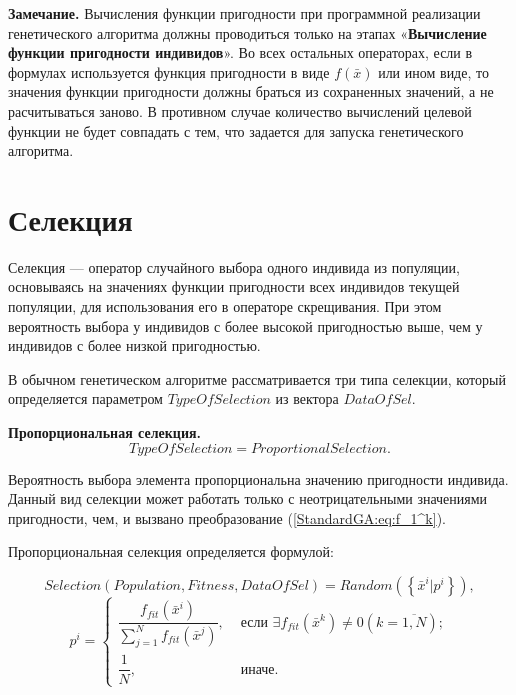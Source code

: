 \textbf{Замечание.} Вычисления функции пригодности при программной реализации генетического алгоритма должны проводиться только на этапах «\textbf{Вычисление функции пригодности индивидов}». Во всех остальных операторах, если в формулах используется функция пригодности в виде $f\left( \bar{x}\right) $ или ином виде, то значения функции пригодности должны браться из сохраненных значений, а не расчитываться заново. В противном случае количество вычислений целевой функции не будет совпадать с тем, что задается для запуска генетического алгоритма.

\section{Селекция} \label{StandardGA:subsection_selection}

Селекция --- оператор случайного выбора одного индивида из популяции, основываясь на значениях функции пригодности всех индивидов текущей популяции, для использования его в операторе скрещивания. При этом вероятность выбора у индивидов с более высокой пригодностью выше, чем у индивидов с более низкой пригодностью.

В обычном генетическом алгоритме рассматривается три типа селекции, который определяется параметром $ TypeOfSelection $ из вектора $ DataOfSel $.

\textbf{Пропорциональная селекция.}
\begin{equation}
\label{StandardGA:eq:ProportionalSelection}
TypeOfSelection=ProportionalSelection.
\end{equation}

Вероятность выбора элемента пропорциональна значению пригодности индивида. Данный вид селекции может работать только с неотрицательными значениями пригодности, чем, и вызвано преобразование (\ref{StandardGA:eq:f_1^k}).

Пропорциональная селекция определяется формулой:

\begin{equation}
\label{StandardGA:eq:ProportionalSelection2}
Selection\left( Population, Fitness, DataOfSel\right) = Random\left( \left\lbrace\bar{x}^i | p^i \right\rbrace \right),
\end{equation}
\begin{equation}
p^i=\left\lbrace \begin{aligned}
\dfrac{f_{fit}\left( \bar{x}^i\right) }{\sum_{j=1}^N{f_{fit}\left( \bar{x}^j\right)}},&\text { если }  \exists f_{fit}\left( \bar{x}^k\right)\neq 0 \left( k=\overline{1,N} \right); \\ \dfrac{1}{N} ,&\text { иначе}.
\end{aligned}\right.
\end{equation}


